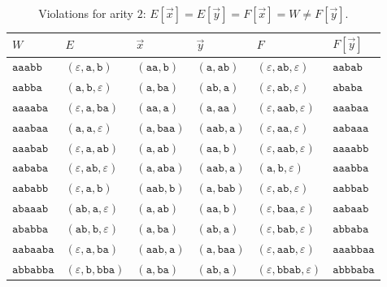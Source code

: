 \documentclass[11pt]{article}
\numberwithin{equation}{section}
\theoremstyle{plain}
\theoremstyle{definition}
\theoremstyle{remark}
\newcommand{\tuple}[1]{\vec{#1}}
\newcommand{\eps}{\varepsilon}
\theoremstyle{plain}
\begin{document}
\begin{table}[htbp]
\caption{Violations for arity $2$: $E[\tuple x]=E[\tuple y]=F[\tuple x]=W\ne F[\tuple y]$.}
\label{tab:singleton-certificates}
\centering
\scriptsize
\setlength{\tabcolsep}{3pt}
\renewcommand{\arraystretch}{1.05}
\begin{tabular}{@{}llllll@{}}
\hline
$W$ & $E$ & $\tuple x$ & $\tuple y$ & $F$ & $F[\tuple y]$\\
\hline
$\mathtt{aaabb}$ & $(\eps,\mathtt{a},\mathtt{b})$ & $(\mathtt{aa},\mathtt{b})$ & $(\mathtt{a},\mathtt{ab})$ & $(\eps,\mathtt{ab},\eps)$ & $\mathtt{aabab}$\\
$\mathtt{aabba}$ & $(\mathtt{a},\mathtt{b},\eps)$ & $(\mathtt{a},\mathtt{ba})$ & $(\mathtt{ab},\mathtt{a})$ & $(\eps,\mathtt{ab},\eps)$ & $\mathtt{ababa}$\\
$\mathtt{aaaaba}$ & $(\eps,\mathtt{a},\mathtt{ba})$ & $(\mathtt{aa},\mathtt{a})$ & $(\mathtt{a},\mathtt{aa})$ & $(\eps,\mathtt{aab},\eps)$ & $\mathtt{aaabaa}$\\
$\mathtt{aaabaa}$ & $(\mathtt{a},\mathtt{a},\eps)$ & $(\mathtt{a},\mathtt{baa})$ & $(\mathtt{aab},\mathtt{a})$ & $(\eps,\mathtt{aa},\eps)$ & $\mathtt{aabaaa}$\\
$\mathtt{aaabab}$ & $(\eps,\mathtt{a},\mathtt{ab})$ & $(\mathtt{a},\mathtt{ab})$ & $(\mathtt{aa},\mathtt{b})$ & $(\eps,\mathtt{aab},\eps)$ & $\mathtt{aaaabb}$\\
$\mathtt{aababa}$ & $(\eps,\mathtt{ab},\eps)$ & $(\mathtt{a},\mathtt{aba})$ & $(\mathtt{aab},\mathtt{a})$ & $(\mathtt{a},\mathtt{b},\eps)$ & $\mathtt{aaabba}$\\
$\mathtt{aababb}$ & $(\eps,\mathtt{a},\mathtt{b})$ & $(\mathtt{aab},\mathtt{b})$ & $(\mathtt{a},\mathtt{bab})$ & $(\eps,\mathtt{ab},\eps)$ & $\mathtt{aabbab}$\\
$\mathtt{abaaab}$ & $(\mathtt{ab},\mathtt{a},\eps)$ & $(\mathtt{a},\mathtt{ab})$ & $(\mathtt{aa},\mathtt{b})$ & $(\eps,\mathtt{baa},\eps)$ & $\mathtt{aabaab}$\\
$\mathtt{ababba}$ & $(\mathtt{ab},\mathtt{b},\eps)$ & $(\mathtt{a},\mathtt{ba})$ & $(\mathtt{ab},\mathtt{a})$ & $(\eps,\mathtt{bab},\eps)$ & $\mathtt{abbaba}$\\
$\mathtt{aabaaba}$ & $(\eps,\mathtt{a},\mathtt{ba})$ & $(\mathtt{aab},\mathtt{a})$ & $(\mathtt{a},\mathtt{baa})$ & $(\eps,\mathtt{aab},\eps)$ & $\mathtt{aaabbaa}$\\
$\mathtt{abbabba}$ & $(\eps,\mathtt{b},\mathtt{bba})$ & $(\mathtt{a},\mathtt{ba})$ & $(\mathtt{ab},\mathtt{a})$ & $(\eps,\mathtt{bbab},\eps)$ & $\mathtt{abbbaba}$\\
\hline
\end{tabular}
\end{table}
\end{document}

